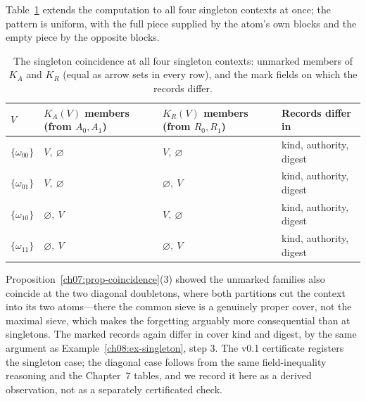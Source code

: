 Table~\ref{ch08:tab-singletons} extends the computation to all four singleton contexts at once; the pattern is uniform, with the full piece supplied by the atom's own blocks and the empty piece by the opposite blocks.

\begin{table}[htbp]
\centering
\caption{The singleton coincidence at all four singleton contexts: unmarked members of $K_{A}$ and $K_{R}$ (equal as arrow sets in every row), and the mark fields on which the records differ.}
\label{ch08:tab-singletons}
\begin{tabular}{@{}llll@{}}
\toprule
$V$ & $K_{A}(V)$ members (from $A_{0},A_{1}$) & $K_{R}(V)$ members (from $R_{0},R_{1}$) & Records differ in \\
\midrule
$\{\omega_{00}\}$ & $V,\ \varnothing$ & $V,\ \varnothing$ & kind, authority, digest \\
$\{\omega_{01}\}$ & $V,\ \varnothing$ & $\varnothing,\ V$ & kind, authority, digest \\
$\{\omega_{10}\}$ & $\varnothing,\ V$ & $V,\ \varnothing$ & kind, authority, digest \\
$\{\omega_{11}\}$ & $\varnothing,\ V$ & $\varnothing,\ V$ & kind, authority, digest \\
\bottomrule
\end{tabular}
\end{table}

\begin{remark}\label{ch08:rem-diagonal}
Proposition~\ref{ch07:prop-coincidence}(3) showed the unmarked families also coincide at the two diagonal doubletons, where both partitions cut the context into its two atoms---there the common sieve is a genuinely proper cover, not the maximal sieve, which makes the forgetting arguably more consequential than at singletons. The marked records again differ in cover kind and digest, by the same argument as Example~\ref{ch08:ex-singleton}, step 3. The v0.1 certificate registers the singleton case; the diagonal case follows from the same field-inequality reasoning and the Chapter~7 tables, and we record it here as a derived observation, not as a separately certificated check.
\end{remark}

